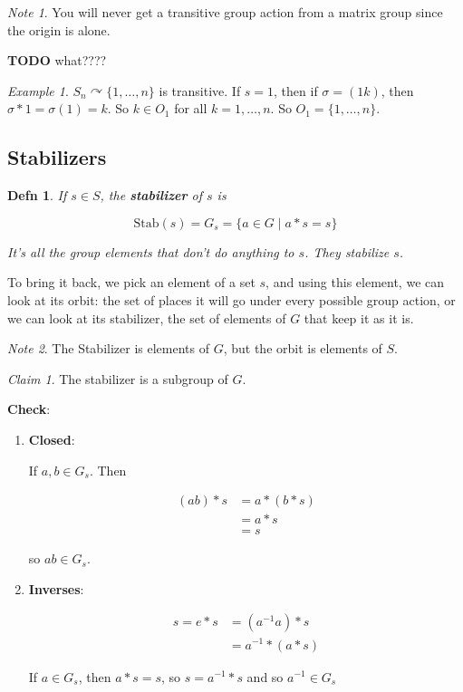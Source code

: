 \documentclass[12pt]{article}
\def\Stab{\text{Stab}}
\def\acts{\curvearrowright} %
\def\TODO{\color{red}\textbf{TODO}\color{black}}
\newtheorem{definition}{Defn}
\theoremstyle{remark}
\theoremstyle{remark}
\newtheorem{claim}{Claim}
\theoremstyle{remark}
\newtheorem{example}{Example}
\theoremstyle{remark}
\theoremstyle{remark}
\newtheorem*{note}{Note}
\begin{document}
\begin{note}
  You will never get a transitive group action from a matrix group since the
  origin is alone.

  \TODO{} what????
\end{note}

\begin{example}
  $S_n \acts \{1, \dots, n\}$ is transitive. If $s = 1$, then if $\sigma = (1
  k)$, then $\sigma * 1 = \sigma(1) = k$. So $k \in O_1$ for all $k = 1, \dots,
  n$. So $O_1 = \{1, \dots, n\}$.
\end{example}

\subsection{Stabilizers}

\begin{definition}
  If $s \in S$, the {\bf stabilizer} of $s$ is

  \[
    \Stab(s) = G_s = \{a \in G \mid a * s = s\}
  \]

  It's all the group elements that don't do anything to $s$. They {\it
  stabilize} $s$.
\end{definition}

To bring it back, we pick an element of a set $s$, and using this element, we
can look at its orbit: the set of places it will go under every possible group
action, or we can look at its stabilizer, the set of elements of $G$ that keep
it as it is.

\begin{note}
  The Stabilizer is elements of $G$, but the orbit is elements of $S$.
\end{note}

\begin{claim}
  The stabilizer is a subgroup of $G$.
\end{claim}

{\bf Check}:
\begin{enumerate}
  \item {\bf Closed}:

    If $a, b \in G_s$. Then

    \begin{align*}
      (ab) * s &= a * (b * s) \\
               &= a * s \\
               &= s
    \end{align*}

    so $ab \in G_s$.

  \item {\bf Inverses}:

    \begin{align*}
      s = e * s &= (a^{-1} a) * s \\
                &= a^{-1} * (a * s)
    \end{align*}

    If $a \in G_s$, then $a * s = s$, so $s = a^{-1} * s$ and so $a^{-1} \in G_s$
\end{enumerate}
\end{document}
